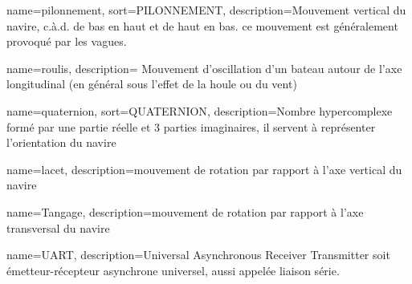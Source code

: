  {
    name=pilonnement,
    sort={PILONNEMENT},
    description={Mouvement vertical du navire, c.à.d. de bas en haut et de haut en bas. ce mouvement est généralement provoqué par les vagues.}
    }

 {
	name=roulis,
	description={ Mouvement d'oscillation d'un bateau autour de l'axe longitudinal (en général sous l'effet de la houle ou du vent)}
}

 {
	name=quaternion,
	sort={QUATERNION},
	description={Nombre hypercomplexe formé par une partie réelle et 3 parties imaginaires, il servent à représenter l'orientation du navire}
}

 {
	name=lacet,
	description={mouvement de rotation par rapport à l'axe vertical du navire}
    }

 {
	name=Tangage,
	description={mouvement de rotation par rapport à l'axe transversal du navire}
    }

 {
	name=UART,
	description={Universal Asynchronous Receiver Transmitter soit émetteur-récepteur asynchrone universel, aussi appelée liaison série.}
}
